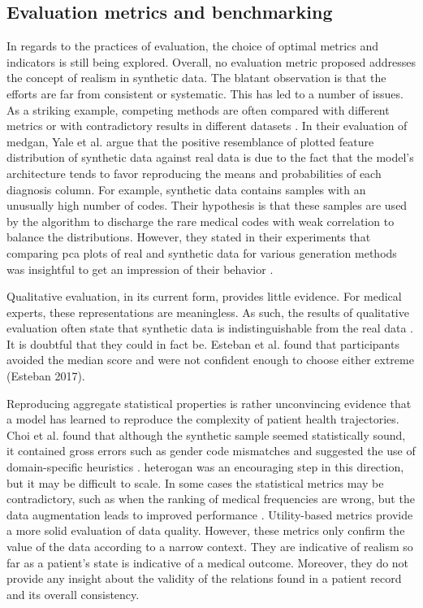 \subsection{Evaluation metrics and benchmarking}
In regards to the practices of evaluation, the choice of optimal metrics and indicators is still being explored. Overall, no evaluation metric proposed addresses the concept of realism in synthetic data. The blatant observation is that the efforts are far from consistent or systematic. This has led to a number of issues. As a striking example, competing methods are often compared with different metrics or with contradictory results in different datasets \cite{baowaly_2019_IEEE,baowaly_2019_jamia,Camino2018-re,Choi2017-nt,Zhang2020}. In their evaluation of \gls{medgan}, Yale et al. argue that the positive resemblance of plotted feature distribution of synthetic data against real data is due to the fact that the model's architecture tends to favor reproducing the means and probabilities of each diagnosis column. For example, synthetic data contains samples with an unusually high number of codes. Their hypothesis is that these samples are used by the algorithm to discharge the rare medical codes with weak correlation to balance the distributions. However, they stated in their experiments that comparing \gls{pca} plots of real and synthetic data for various generation methods was insightful to get an impression of their behavior \cite{Yale_2020}.\par
Qualitative evaluation, in its current form, provides little evidence. For medical experts, these representations are meaningless. As such, the results of qualitative evaluation often state that synthetic data is indistinguishable from the real data \cite{Choi2017-nt,Wang_2019}. It is doubtful that they could in fact be. Esteban et al. found that participants avoided the median score and were not confident enough to choose either extreme (Esteban 2017).\par
Reproducing aggregate statistical properties is rather unconvincing evidence that a model has learned to reproduce the complexity of patient health trajectories. Choi et al. found that although the synthetic sample seemed statistically sound, it contained gross errors such as gender code mismatches and suggested the use of domain-specific heuristics \cite{Choi2017-nt}. \gls{heterogan} was an encouraging step in this direction, but it may be difficult to scale. In some cases the statistical metrics may be contradictory, such as when the ranking of medical frequencies are wrong, but the data augmentation leads to improved performance \cite{Che_2017}.
Utility-based metrics provide a more solid evaluation of data quality. However, these metrics only confirm the value of the data according to a narrow context. They are indicative of realism so far as a patient's state is indicative of a medical outcome. Moreover, they do not provide any insight about the validity of the relations found in a patient record and its overall consistency.\par


